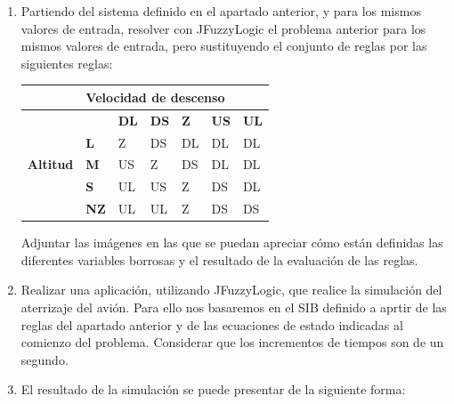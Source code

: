 \documentclass[
]{article}
\begin{document}
\begin{enumerate}
\def\labelenumi{\arabic{enumi}.}
\item
  Partiendo del sistema definido en el apartado anterior, y para los
  mismos valores de entrada, resolver con JFuzzyLogic el problema
  anterior para los mismos valores de entrada, pero sustituyendo el
  conjunto de reglas por las siguientes reglas:

  \begin{table}[H]
  \centering
  \begin{tabular}{|l|llllll|}
  \hline
                                 & \multicolumn{6}{l|}{\textbf{Velocidad de descenso}}                                                                                                                                       \\ \hline
  \multirow{5}{*}{\textbf{Altitud}} & \multicolumn{1}{l|}{}            & \multicolumn{1}{l|}{\textbf{DL}} & \multicolumn{1}{l|}{\textbf{DS}} & \multicolumn{1}{l|}{\textbf{Z}} & \multicolumn{1}{l|}{\textbf{US}} & \textbf{UL} \\ \cline{2-7} 
                                 & \multicolumn{1}{l|}{\textbf{L}}  & \multicolumn{1}{l|}{Z}           & \multicolumn{1}{l|}{DS}          & \multicolumn{1}{l|}{DL}         & \multicolumn{1}{l|}{DL}          & DL          \\ \cline{2-7} 
                                 & \multicolumn{1}{l|}{\textbf{M}}  & \multicolumn{1}{l|}{US}          & \multicolumn{1}{l|}{Z}           & \multicolumn{1}{l|}{DS}         & \multicolumn{1}{l|}{DL}          & DL          \\ \cline{2-7} 
                                 & \multicolumn{1}{l|}{\textbf{S}}  & \multicolumn{1}{l|}{UL}          & \multicolumn{1}{l|}{US}          & \multicolumn{1}{l|}{Z}          & \multicolumn{1}{l|}{DS}          & DL          \\ \cline{2-7} 
                                 & \multicolumn{1}{l|}{\textbf{NZ}} & \multicolumn{1}{l|}{UL}          & \multicolumn{1}{l|}{UL}          & \multicolumn{1}{l|}{Z}          & \multicolumn{1}{l|}{DS}          & DS          \\ \hline
  \end{tabular}
  \end{table}

  Adjuntar las imágenes en las que se puedan apreciar cómo están
  definidas las diferentes variables borrosas y el resultado de la
  evaluación de las reglas.
\item
  Realizar una aplicación, utilizando JFuzzyLogic, que realice la
  simulación del aterrizaje del avión. Para ello nos basaremos en el SIB
  definido a aprtir de las reglas del apartado anterior y de las
  ecuaciones de estado indicadas al comienzo del problema. Considerar
  que los incrementos de tiempos son de un segundo.
\item
  El resultado de la simulación se puede presentar de la siguiente
  forma:


\end{enumerate}
\end{document}
